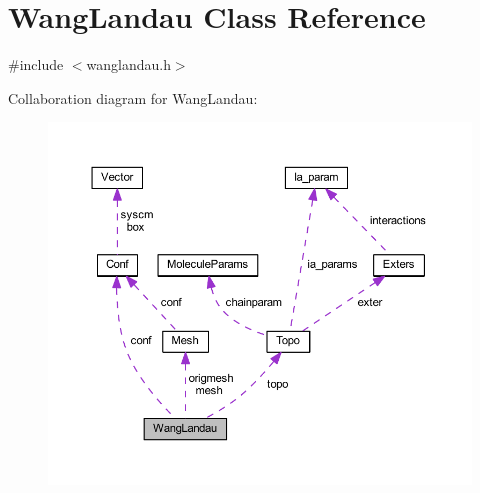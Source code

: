 \hypertarget{class_wang_landau}{\section{Wang\+Landau Class Reference}
\label{class_wang_landau}
}


{\ttfamily \#include $<$wanglandau.\+h$>$}



Collaboration diagram for Wang\+Landau\+:\nopagebreak
\begin{figure}[H]
\begin{center}
\leavevmode
\includegraphics[width=350pt]{class_wang_landau__coll__graph}
\end{center}
\end{figure}
